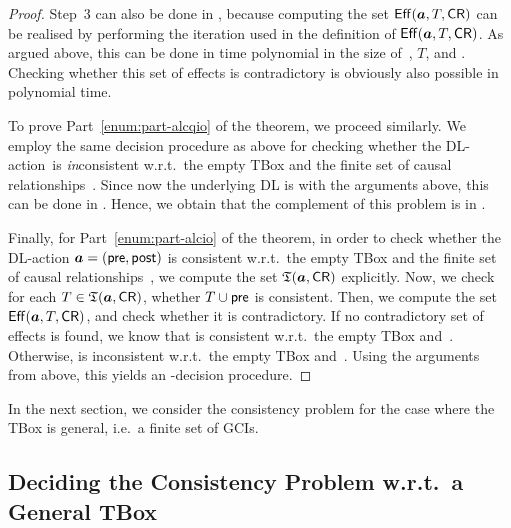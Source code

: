 \begin{proof}
    Step~3 can also be done in \PSpace, because computing the set
    $\operatorname{\mathsf{Eff}}(\boldsymbol a,T,\mathsf{CR})$ can be realised by performing the iteration used in the
    definition of $\operatorname{\mathsf{Eff}}(\boldsymbol a,T,\mathsf{CR})$.  As argued above, this can be done in
    time polynomial in the size of~\abf, $T$, and \CR.  Checking whether this
    set of effects is contradictory is obviously also possible in polynomial
    time.

    To prove Part~\ref{enum:part-alcqio} of the theorem, we proceed similarly.
    We employ the same decision procedure as above for checking whether the
    DL-action~\abf is \emph{in}consistent w.r.t.\ the empty TBox and the finite
    set of causal relationships~\CR.  Since now the underlying DL is \ALCQIO
    with the arguments above, this can be done in \NExpTime.  Hence, we obtain
    that the complement of this problem is in \coNExpTime.

    Finally, for Part~\ref{enum:part-alcio} of the theorem, in order to check
    whether the DL-action $\boldsymbol a=(\mathsf{pre},\mathsf{post})$ is consistent w.r.t.\
    the empty TBox and the finite set of causal relationships~\CR, we compute
    the set $\mathfrak{T}(\boldsymbol a,\mathsf{CR})$ explicitly.  Now, we check for each
    $T\in\mathfrak{T}(\boldsymbol a,\mathsf{CR})$, whether $T\cup\mathsf{pre}$ is consistent.  Then, we compute
    the set $\operatorname{\mathsf{Eff}}(\boldsymbol a,T,\mathsf{CR})$, and check whether it is contradictory.  If no
    contradictory set of effects is found, we know that \abf is consistent
    w.r.t.\ the empty TBox and~\CR.  Otherwise, \abf is inconsistent w.r.t.\ the
    empty TBox and~\CR.  Using the arguments from above, this yields an
    \ExpTime-decision procedure.
\end{proof}

\noindent
In the next section, we consider the consistency problem for the case where the
TBox is general, i.e.~a finite set of GCIs.


\subsection{Deciding the Consistency Problem w.r.t.\ a General TBox}

